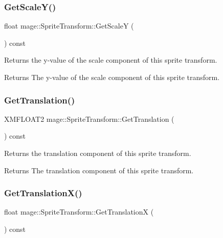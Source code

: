 \subsubsection{\texorpdfstring{Get\+Scale\+Y()}{GetScaleY()}}
{\footnotesize\ttfamily float mage\+::\+Sprite\+Transform\+::\+Get\+ScaleY (\begin{DoxyParamCaption}{ }\end{DoxyParamCaption}) const}

Returns the y-\/value of the scale component of this sprite transform.

\begin{DoxyReturn}{Returns}
The y-\/value of the scale component of this sprite transform. 
\end{DoxyReturn}
\hypertarget{structmage_1_1_sprite_transform_a93170905081d8a7a225d251eda8c6837}{}\label{structmage_1_1_sprite_transform_a93170905081d8a7a225d251eda8c6837} 
\subsubsection{\texorpdfstring{Get\+Translation()}{GetTranslation()}}
{\footnotesize\ttfamily X\+M\+F\+L\+O\+A\+T2 mage\+::\+Sprite\+Transform\+::\+Get\+Translation (\begin{DoxyParamCaption}{ }\end{DoxyParamCaption}) const}

Returns the translation component of this sprite transform.

\begin{DoxyReturn}{Returns}
The translation component of this sprite transform. 
\end{DoxyReturn}
\hypertarget{structmage_1_1_sprite_transform_ab33e1ff3c03940072538fe4a6b746f10}{}\label{structmage_1_1_sprite_transform_ab33e1ff3c03940072538fe4a6b746f10} 
\subsubsection{\texorpdfstring{Get\+Translation\+X()}{GetTranslationX()}}
{\footnotesize\ttfamily float mage\+::\+Sprite\+Transform\+::\+Get\+TranslationX (\begin{DoxyParamCaption}{ }\end{DoxyParamCaption}) const}

